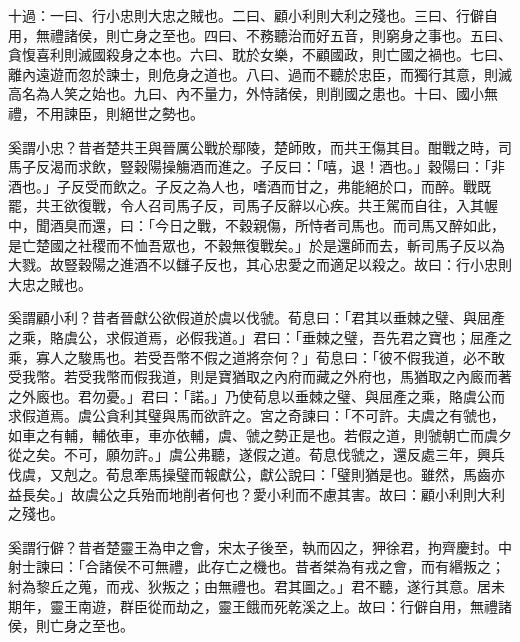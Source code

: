 
\begin{pinyinscope}
十過：一曰、行小忠則大忠之賊也。二曰、顧小利則大利之殘也。三曰、行僻自用，無禮諸侯，則亡身之至也。四曰、不務聽治而好五音，則窮身之事也。五曰、貪愎喜利則滅國殺身之本也。六曰、耽於女樂，不顧國政，則亡國之禍也。七曰、離內遠遊而忽於諫士，則危身之道也。八曰、過而不聽於忠臣，而獨行其意，則滅高名為人笑之始也。九曰、內不量力，外恃諸侯，則削國之患也。十曰、國小無禮，不用諫臣，則絕世之勢也。

奚謂小忠？昔者楚共王與晉厲公戰於鄢陵，楚師敗，而共王傷其目。酣戰之時，司馬子反渴而求飲，豎穀陽操觴酒而進之。子反曰：「嘻，退！酒也。」穀陽曰：「非酒也。」子反受而飲之。子反之為人也，嗜酒而甘之，弗能絕於口，而醉。戰既罷，共王欲復戰，令人召司馬子反，司馬子反辭以心疾。共王駕而自往，入其幄中，聞酒臭而還，曰：「今日之戰，不穀親傷，所恃者司馬也。而司馬又醉如此，是亡楚國之社稷而不恤吾眾也，不穀無復戰矣。」於是還師而去，斬司馬子反以為大戮。故豎穀陽之進酒不以讎子反也，其心忠愛之而適足以殺之。故曰：行小忠則大忠之賊也。

奚謂顧小利？昔者晉獻公欲假道於虞以伐虢。荀息曰：「君其以垂棘之璧、與屈產之乘，賂虞公，求假道焉，必假我道。」君曰：「垂棘之璧，吾先君之寶也；屈產之乘，寡人之駿馬也。若受吾幣不假之道將奈何？」荀息曰：「彼不假我道，必不敢受我幣。若受我幣而假我道，則是寶猶取之內府而藏之外府也，馬猶取之內廄而著之外廄也。君勿憂。」君曰：「諾。」乃使荀息以垂棘之璧、與屈產之乘，賂虞公而求假道焉。虞公貪利其璧與馬而欲許之。宮之奇諫曰：「不可許。夫虞之有虢也，如車之有輔，輔依車，車亦依輔，虞、虢之勢正是也。若假之道，則虢朝亡而虞夕從之矣。不可，願勿許。」虞公弗聽，遂假之道。荀息伐虢之，還反處三年，興兵伐虞，又剋之。荀息牽馬操璧而報獻公，獻公說曰：「璧則猶是也。雖然，馬齒亦益長矣。」故虞公之兵殆而地削者何也？愛小利而不慮其害。故曰：顧小利則大利之殘也。

奚謂行僻？昔者楚靈王為申之會，宋太子後至，執而囚之，狎徐君，拘齊慶封。中射士諫曰：「合諸侯不可無禮，此存亡之機也。昔者桀為有戎之會，而有緡叛之；紂為黎丘之蒐，而戎、狄叛之；由無禮也。君其圖之。」君不聽，遂行其意。居未期年，靈王南遊，群臣從而劫之，靈王餓而死乾溪之上。故曰：行僻自用，無禮諸侯，則亡身之至也。


\end{pinyinscope}
